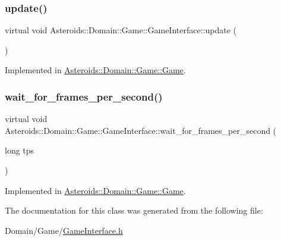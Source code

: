 \mbox{\label{classAsteroids_1_1Domain_1_1Game_1_1GameInterface_a34d23ca6c1559d84f99a8aeec8ead3ed}} 
\subsubsection{\texorpdfstring{update()}{update()}}
{\footnotesize\ttfamily virtual void Asteroids\+::\+Domain\+::\+Game\+::\+Game\+Interface\+::update (\begin{DoxyParamCaption}{ }\end{DoxyParamCaption})\hspace{0.3cm}{\ttfamily [pure virtual]}}



Implemented in \hyperlink{classAsteroids_1_1Domain_1_1Game_1_1Game_aa63114be578393b0113f116798346ac4}{Asteroids\+::\+Domain\+::\+Game\+::\+Game}.

\mbox{\label{classAsteroids_1_1Domain_1_1Game_1_1GameInterface_a91c58ac4b19f3e2325b91fff0e3c187a}} 
\subsubsection{\texorpdfstring{wait\+\_\+for\+\_\+frames\+\_\+per\+\_\+second()}{wait\_for\_frames\_per\_second()}}
{\footnotesize\ttfamily virtual void Asteroids\+::\+Domain\+::\+Game\+::\+Game\+Interface\+::wait\+\_\+for\+\_\+frames\+\_\+per\+\_\+second (\begin{DoxyParamCaption}\item[{long}]{tps }\end{DoxyParamCaption})\hspace{0.3cm}{\ttfamily [pure virtual]}}



Implemented in \hyperlink{classAsteroids_1_1Domain_1_1Game_1_1Game_ab586cddf7972dbb9313ad3b241b550b4}{Asteroids\+::\+Domain\+::\+Game\+::\+Game}.



The documentation for this class was generated from the following file\+:\begin{DoxyCompactItemize}
\item 
Domain/\+Game/\hyperlink{GameInterface_8h}{Game\+Interface.\+h}\end{DoxyCompactItemize}
